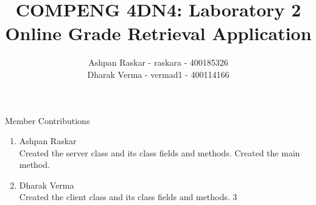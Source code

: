 \documentclass[titlepage]{article}
\title{COMPENG 4DN4: Laboratory 2\\Online Grade Retrieval Application}
\author{Ashpan Raskar - raskara - 400185326\\Dharak Verma - vermad1 - 400114166}
\date{}
\begin{document}
    \maketitle
    \newpage

    \begin{section}{Member Contributions}
        \begin{enumerate}
            \item Ashpan Raskar \\
            Created the server class and its class fields and methods. Created the main method.
            \item Dharak Verma \\
            Created the client class and its class fields and methods.
3
        \end{enumerate}

    \end{section}
\end{document}
